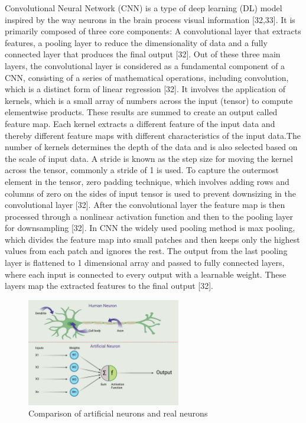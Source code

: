 \documentclass[12pt,a4paper]{report}
\begin{document}
Convolutional Neural Network (CNN) is a type of deep learning (DL) model inspired by the way neurons in the brain process visual information [32,33]. It is primarily composed of three core components: A convolutional layer that extracts features, a pooling layer to reduce the 
dimensionality of data and a fully connected layer that produces the final output [32]. Out of these three main layers, the convolutional layer is considered as a fundamental component of a CNN, consisting of a series of mathematical operations, including convolution, which is 
a distinct form of linear regression [32]. It involves the application of kernels, which is a small array of numbers across the input (tensor) to compute elementwise products. These results are summed to create an output called feature map. Each kernel extracts a different feature 
of the input data and thereby different feature maps with different characteristics of the input data.The number of kernels determines the depth of the data and is also selected based on the scale of input data. A stride is known as the step size for moving the kernel across the tensor, 
commonly a stride of 1 is used. To capture the outermost element in the tensor, zero padding technique, which involves adding rows and columns of zero on the sides of input tensor is used to prevent downsizing in the convolutional layer [32]. After the convolutional layer the feature map 
is then processed through a nonlinear activation function and then to the pooling layer for downsampling [32]. In CNN the widely used pooling method is max pooling, which divides the feature map into small patches and then keeps only the highest values from each patch and ignores the rest. 
The output from the last pooling layer is flattened to 1 dimensional array and passed to fully connected layers, where each input is connected to every output with a learnable weight. These layers map the extracted features to the final output [32]. \\

\begin{figure}[h]
    \centering
    \includegraphics[width=0.6\textwidth]{images/neuron2.png}
    \caption{Comparison of artificial neurons and real neurons}
    \label{Figure 4}
\end{figure}
\end{document}

